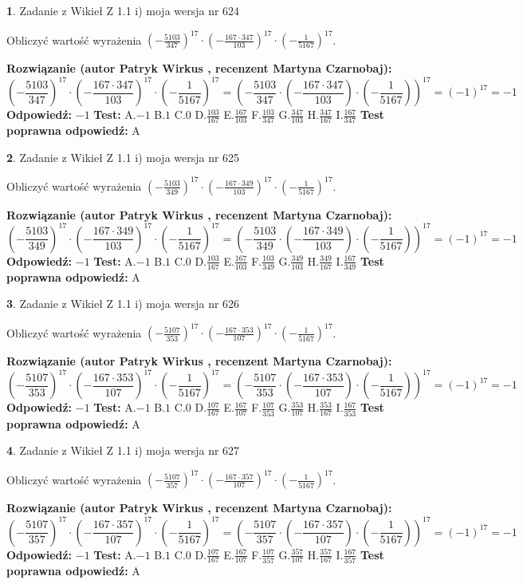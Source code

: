 \documentclass[12pt, a4paper]{article}
\theoremstyle{definition} %
\newtheorem{zad}{}
\newcommand{\zadStart}[1]{\begin{zad}#1\newline}
\newcommand{\zadStop}{\end{zad}}
\newcommand{\rozwStart}[2]{\noindent \textbf{Rozwiązanie (autor #1 , recenzent #2): }\newline}
\newcommand{\rozwStop}{\newline}
\newcommand{\odpStart}{\noindent \textbf{Odpowiedź:}\newline}
\newcommand{\odpStop}{\newline}
\newcommand{\testStart}{\noindent \textbf{Test:}\newline}
\newcommand{\testStop}{\newline}
\newcommand{\kluczStart}{\noindent \textbf{Test poprawna odpowiedź:}\newline}
\newcommand{\kluczStop}{\newline}
\begin{document}
\zadStart{Zadanie z Wikieł Z 1.1 i) moja wersja nr 624}

Obliczyć wartość wyrażenia $(-\frac{5103}{347})^{17} \cdot (-\frac{167 \cdot 347}{103})^{17} \cdot (-\frac{1}{5167})^{17}$.
\zadStop
\rozwStart{Patryk Wirkus}{Martyna Czarnobaj}
$$(-\frac{5103}{347})^{17} \cdot (-\frac{167 \cdot 347}{103})^{17} \cdot (-\frac{1}{5167})^{17} = (-\frac{5103}{347} \cdot (-\frac{167 \cdot 347}{103}) \cdot (-\frac{1}{5167}))^{17} = (-1)^{17} = -1$$
\rozwStop
\odpStart
$-1$
\odpStop
\testStart
A.$-1$ B.$1$ C.$0$ D.$\frac{103}{167}$ E.$\frac{167}{103}$
F.$\frac{103}{347}$ G.$\frac{347}{103}$
H.$\frac{347}{167}$
I.$\frac{167}{347}$
\testStop
\kluczStart
A
\kluczStop



\zadStart{Zadanie z Wikieł Z 1.1 i) moja wersja nr 625}

Obliczyć wartość wyrażenia $(-\frac{5103}{349})^{17} \cdot (-\frac{167 \cdot 349}{103})^{17} \cdot (-\frac{1}{5167})^{17}$.
\zadStop
\rozwStart{Patryk Wirkus}{Martyna Czarnobaj}
$$(-\frac{5103}{349})^{17} \cdot (-\frac{167 \cdot 349}{103})^{17} \cdot (-\frac{1}{5167})^{17} = (-\frac{5103}{349} \cdot (-\frac{167 \cdot 349}{103}) \cdot (-\frac{1}{5167}))^{17} = (-1)^{17} = -1$$
\rozwStop
\odpStart
$-1$
\odpStop
\testStart
A.$-1$ B.$1$ C.$0$ D.$\frac{103}{167}$ E.$\frac{167}{103}$
F.$\frac{103}{349}$ G.$\frac{349}{103}$
H.$\frac{349}{167}$
I.$\frac{167}{349}$
\testStop
\kluczStart
A
\kluczStop



\zadStart{Zadanie z Wikieł Z 1.1 i) moja wersja nr 626}

Obliczyć wartość wyrażenia $(-\frac{5107}{353})^{17} \cdot (-\frac{167 \cdot 353}{107})^{17} \cdot (-\frac{1}{5167})^{17}$.
\zadStop
\rozwStart{Patryk Wirkus}{Martyna Czarnobaj}
$$(-\frac{5107}{353})^{17} \cdot (-\frac{167 \cdot 353}{107})^{17} \cdot (-\frac{1}{5167})^{17} = (-\frac{5107}{353} \cdot (-\frac{167 \cdot 353}{107}) \cdot (-\frac{1}{5167}))^{17} = (-1)^{17} = -1$$
\rozwStop
\odpStart
$-1$
\odpStop
\testStart
A.$-1$ B.$1$ C.$0$ D.$\frac{107}{167}$ E.$\frac{167}{107}$
F.$\frac{107}{353}$ G.$\frac{353}{107}$
H.$\frac{353}{167}$
I.$\frac{167}{353}$
\testStop
\kluczStart
A
\kluczStop



\zadStart{Zadanie z Wikieł Z 1.1 i) moja wersja nr 627}

Obliczyć wartość wyrażenia $(-\frac{5107}{357})^{17} \cdot (-\frac{167 \cdot 357}{107})^{17} \cdot (-\frac{1}{5167})^{17}$.
\zadStop
\rozwStart{Patryk Wirkus}{Martyna Czarnobaj}
$$(-\frac{5107}{357})^{17} \cdot (-\frac{167 \cdot 357}{107})^{17} \cdot (-\frac{1}{5167})^{17} = (-\frac{5107}{357} \cdot (-\frac{167 \cdot 357}{107}) \cdot (-\frac{1}{5167}))^{17} = (-1)^{17} = -1$$
\rozwStop
\odpStart
$-1$
\odpStop
\testStart
A.$-1$ B.$1$ C.$0$ D.$\frac{107}{167}$ E.$\frac{167}{107}$
F.$\frac{107}{357}$ G.$\frac{357}{107}$
H.$\frac{357}{167}$
I.$\frac{167}{357}$
\testStop
\kluczStart
A
\kluczStop
\end{document}
